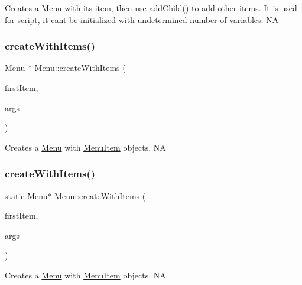 Creates a \hyperlink{classMenu}{Menu} with it\textquotesingle{}s item, then use \hyperlink{classMenu_af557403e8b14bdbda70d85b7d12fedfb}{add\+Child()} to add other items. It is used for script, it can\textquotesingle{}t be initialized with undetermined number of variables.  NA \mbox{\label{classMenu_adbd50ef904f6614d63b6ef6319af14d0}} 
\subsubsection{\texorpdfstring{create\+With\+Items()}{createWithItems()}\hspace{0.1cm}{\footnotesize\ttfamily [1/2]}}
{\footnotesize\ttfamily \hyperlink{classMenu}{Menu} $\ast$ Menu\+::create\+With\+Items (\begin{DoxyParamCaption}\item[{\hyperlink{classMenuItem}{Menu\+Item} $\ast$}]{first\+Item,  }\item[{va\+\_\+list}]{args }\end{DoxyParamCaption})\hspace{0.3cm}{\ttfamily [static]}}

Creates a \hyperlink{classMenu}{Menu} with \hyperlink{classMenuItem}{Menu\+Item} objects.  NA \mbox{\label{classMenu_a3d39a9d0460b53140dbfe69db66ef24b}} 
\subsubsection{\texorpdfstring{create\+With\+Items()}{createWithItems()}\hspace{0.1cm}{\footnotesize\ttfamily [2/2]}}
{\footnotesize\ttfamily static \hyperlink{classMenu}{Menu}$\ast$ Menu\+::create\+With\+Items (\begin{DoxyParamCaption}\item[{\hyperlink{classMenuItem}{Menu\+Item} $\ast$}]{first\+Item,  }\item[{va\+\_\+list}]{args }\end{DoxyParamCaption})\hspace{0.3cm}{\ttfamily [static]}}

Creates a \hyperlink{classMenu}{Menu} with \hyperlink{classMenuItem}{Menu\+Item} objects.  NA \mbox{\label{classMenu_a2f8bee450bcae21f9d5f27941467ff59}} 
